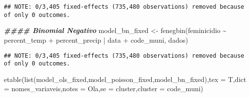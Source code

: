 \documentclass[
]{article}
\newenvironment{Shaded}{\begin{snugshade}}{\end{snugshade}}
\newcommand{\AttributeTok}[1]{\textcolor[rgb]{0.77,0.63,0.00}{#1}}
\newcommand{\DocumentationTok}[1]{\textcolor[rgb]{0.56,0.35,0.01}{\textbf{\textit{#1}}}}
\newcommand{\FunctionTok}[1]{\textcolor[rgb]{0.00,0.00,0.00}{#1}}
\newcommand{\NormalTok}[1]{#1}
\newcommand{\OtherTok}[1]{\textcolor[rgb]{0.56,0.35,0.01}{#1}}
\newcommand{\SpecialCharTok}[1]{\textcolor[rgb]{0.00,0.00,0.00}{#1}}
\newcommand{\StringTok}[1]{\textcolor[rgb]{0.31,0.60,0.02}{#1}}
\begin{document}
\begin{verbatim}
## NOTE: 0/3,405 fixed-effects (735,480 observations) removed because of only 0 outcomes.
\end{verbatim}

\begin{Shaded}
\begin{Highlighting}[]
\DocumentationTok{\#\#\#\# Binomial Negativo}
\NormalTok{model\_bn\_fixed }\OtherTok{\textless{}{-}} \FunctionTok{fenegbin}\NormalTok{(feminicidio  }\SpecialCharTok{\textasciitilde{}}\NormalTok{ percent\_temp }\SpecialCharTok{+}\NormalTok{ percent\_precip }\SpecialCharTok{|}\NormalTok{ data }\SpecialCharTok{+}\NormalTok{ code\_muni, dados)}
\end{Highlighting}
\end{Shaded}

\begin{verbatim}
## NOTE: 0/3,405 fixed-effects (735,480 observations) removed because of only 0 outcomes.
\end{verbatim}

\begin{Shaded}
\begin{Highlighting}[]
\FunctionTok{etable}\NormalTok{(}\FunctionTok{list}\NormalTok{(model\_ols\_fixed,model\_poisson\_fixed,model\_bn\_fixed),}\AttributeTok{tex =}\NormalTok{ T,}\AttributeTok{dict =}\NormalTok{ nomes\_variaveis,}\AttributeTok{notes =} \StringTok{\textquotesingle{}Ola\textquotesingle{}}\NormalTok{,}\AttributeTok{se =} \StringTok{\textquotesingle{}cluster\textquotesingle{}}\NormalTok{,}\AttributeTok{cluster =} \StringTok{\textquotesingle{}code\_muni\textquotesingle{}}\NormalTok{)}
\end{Highlighting}
\end{Shaded}
\end{document}
